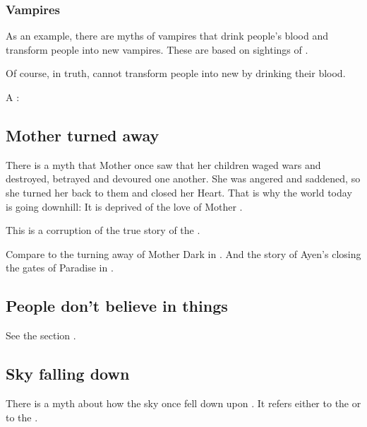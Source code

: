 \subsubsection{Vampires}
As an example, there are myths of vampires that drink people's blood and transform people into new vampires. These are based on sightings of . 

Of course, in truth, \resphain{} cannot transform people into new \resphain{} by drinking their blood. 

A \resphan: 









\subsection{Mother \Miith turned away}
There is a myth that Mother \Miith{} once saw that her children waged wars and destroyed, betrayed and devoured one another. 
She was angered and saddened, so she turned her back to them and closed her Heart.
That is why the world today is going downhill: 
It is deprived of the love of Mother \Miith{}. 

This is a corruption of the true story of the . 

Compare to the turning away of Mother Dark in \cite{StevenEriksonIanCameronEsslemont:MalazanBookoftheFallen}. 
And the story of Ayen's closing the gates of Paradise in . 









\subsection{People don't believe in things}
See the section . 









\subsection{Sky falling down}
There is a myth about how the sky once fell down upon \Miith{}. It refers either to the \secondbanewar{} or to the \CuezcanApocalypse. 

